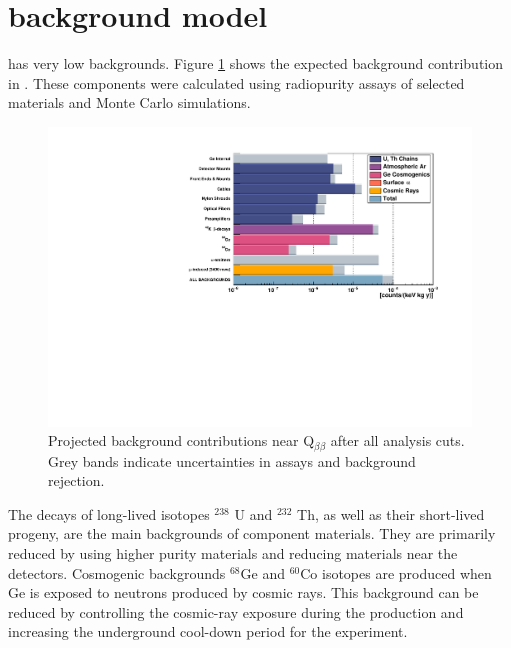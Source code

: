 

\section{{\Ltwo} background model}

{\Ltwo} has very low backgrounds. Figure \ref{fig:L200_background} shows the expected background contribution in {\Ltwo}. These components were calculated using radiopurity assays of selected materials and Monte Carlo simulations. 

\begin{figure}[!htb]
\centering
  \includegraphics[width=0.99\linewidth]{ch2/figs/L200_background.pdf}
  \caption{{\Ltwo} Projected background contributions near Q$_{\beta\beta}$ after all analysis cuts. Grey bands indicate uncertainties in assays and background rejection.}
\label{fig:L200_background}
  \end{figure}


  
The decays of long-lived isotopes $^{238}$ U and $^{232}$ Th, as well as their short-lived progeny, are the main backgrounds of component materials. They are primarily reduced by using higher purity materials and reducing materials near the detectors. Cosmogenic backgrounds $^{68}$Ge and $^{60}$Co isotopes are produced when Ge is exposed to neutrons produced by cosmic rays. This background can be reduced by controlling the cosmic-ray exposure during the production and increasing the underground cool-down period for the experiment. 

